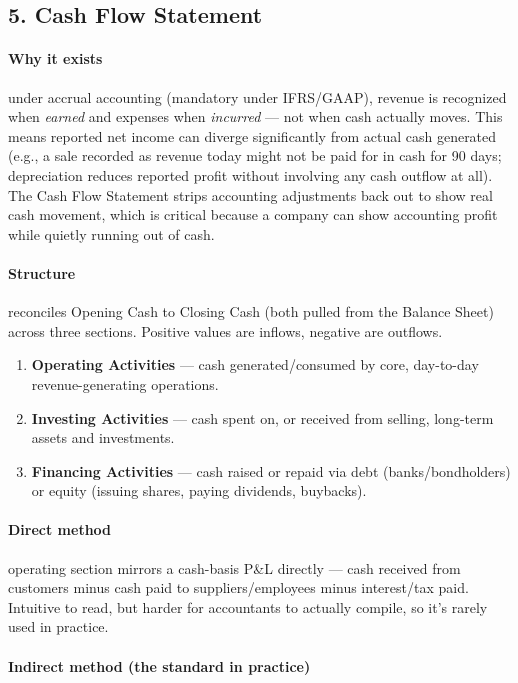 \documentclass[12pt,openany]{book}
\begin{document}
\subsection{5. Cash Flow Statement}

\paragraph{Why it exists} under accrual accounting (mandatory under IFRS/GAAP), revenue is recognized when \emph{earned} and expenses when \emph{incurred} --- not when cash actually moves. This means reported net income can diverge significantly from actual cash generated (e.g., a sale recorded as revenue today might not be paid for in cash for 90 days; depreciation reduces reported profit without involving any cash outflow at all). The Cash Flow Statement strips accounting adjustments back out to show real cash movement, which is critical because a company can show accounting profit while quietly running out of cash.

\paragraph{Structure} reconciles Opening Cash to Closing Cash (both pulled from the Balance Sheet) across three sections. Positive values are inflows, negative are outflows.

\begin{enumerate}[leftmargin=*]
    \item \textbf{Operating Activities} --- cash generated/consumed by core, day-to-day revenue-generating operations.
    \item \textbf{Investing Activities} --- cash spent on, or received from selling, long-term assets and investments.
    \item \textbf{Financing Activities} --- cash raised or repaid via debt (banks/bondholders) or equity (issuing shares, paying dividends, buybacks).
\end{enumerate}

\paragraph{Direct method} operating section mirrors a cash-basis P\&L directly --- cash received from customers minus cash paid to suppliers/employees minus interest/tax paid. Intuitive to read, but harder for accountants to actually compile, so it's rarely used in practice.

\paragraph{Indirect method (the standard in practice)} 
\end{document}
